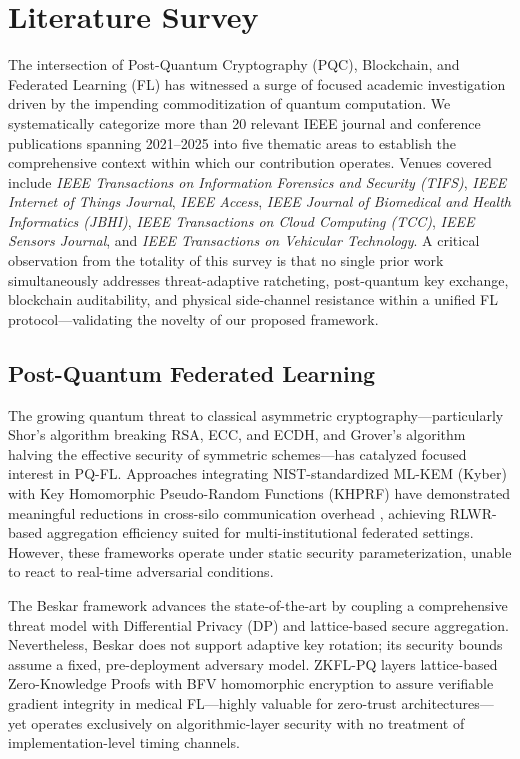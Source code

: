 \documentclass[journal, 10pt, twocolumn]{IEEEtran}
\begin{document}
\section{Literature Survey}
The intersection of Post-Quantum Cryptography (PQC), Blockchain, and Federated Learning (FL) has witnessed a surge of focused academic investigation driven by the impending commoditization of quantum computation. We systematically categorize more than 20 relevant IEEE journal and conference publications spanning 2021--2025 into five thematic areas to establish the comprehensive context within which our contribution operates. Venues covered include \textit{IEEE Transactions on Information Forensics and Security (TIFS)}, \textit{IEEE Internet of Things Journal}, \textit{IEEE Access}, \textit{IEEE Journal of Biomedical and Health Informatics (JBHI)}, \textit{IEEE Transactions on Cloud Computing (TCC)}, \textit{IEEE Sensors Journal}, and \textit{IEEE Transactions on Vehicular Technology}. A critical observation from the totality of this survey is that no single prior work simultaneously addresses threat-adaptive ratcheting, post-quantum key exchange, blockchain auditability, and physical side-channel resistance within a unified FL protocol---validating the novelty of our proposed framework.

\subsection{Post-Quantum Federated Learning}
The growing quantum threat to classical asymmetric cryptography---particularly Shor's algorithm breaking RSA, ECC, and ECDH, and Grover's algorithm halving the effective security of symmetric schemes---has catalyzed focused interest in PQ-FL. Approaches integrating NIST-standardized ML-KEM (Kyber) with Key Homomorphic Pseudo-Random Functions (KHPRF) have demonstrated meaningful reductions in cross-silo communication overhead \cite{pqfl_mdpi}, achieving RLWR-based aggregation efficiency suited for multi-institutional federated settings. However, these frameworks operate under static security parameterization, unable to react to real-time adversarial conditions.

The Beskar framework \cite{beskar} advances the state-of-the-art by coupling a comprehensive threat model with Differential Privacy (DP) and lattice-based secure aggregation. Nevertheless, Beskar does not support adaptive key rotation; its security bounds assume a fixed, pre-deployment adversary model. ZKFL-PQ \cite{zkflpq} layers lattice-based Zero-Knowledge Proofs with BFV homomorphic encryption to assure verifiable gradient integrity in medical FL---highly valuable for zero-trust architectures---yet operates exclusively on algorithmic-layer security with no treatment of implementation-level timing channels.
\end{document}
